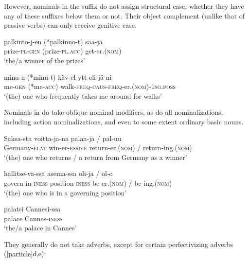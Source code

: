 \documentclass[output=paper,
modfonts
]{LSP/langsci}
\newcommand{\rfa}[2]{(\ref{#1}{#2})}
\begin{document}
 However, nominals in the suffix  do not assign structural
case,  whether they have any of these suffixes below them or not.  Their object
complement (unlike that of passive verbs) can only receive genitive case.
\begin{exe}
\ex
\ea \gll palkinto-j-en (*palkinno-t) saa-ja \\
prize-\textsc{pl}-\textsc{gen} (prize-\textsc{pl}.\textsc{acc}) get-er.(\textsc{nom})\\
\glt `the/a winner of the prizes'

\ex \gll minu-n (*minu-t) käv-el-ytt-eli-jä-ni \\
me-\textsc{gen} (*me-\textsc{acc}) walk-\textsc{freq}-\textsc{caus}-\textsc{freq}-er.(\textsc{nom})-\textsc{1sg}.\textsc{poss}\\
\glt `(the) one who frequently takes me around for walks'  
\z
\end{exe}
Nominals in  do take oblique nominal modifiers, as do all nominalizations, including
action nominalizations, and even to some extent ordinary basic nouns.
\begin{exe}
\ex\label{cann}
	\ea \gll Saksa-sta voitta-ja-na palaa-ja / pal-uu \\
    Germany-\textsc{elat} win-er-\textsc{essive} return-er.(\textsc{nom}) / return-ing.(\textsc{nom})\\
    \glt `(the) one who returns / a return from Germany as a winner' 
 
	\ex \gll hallitse-va-ssa asema-ssa oli-ja / ol-o \\
govern-in-\textsc{iness} position-\textsc{iness} be-er.(\textsc{nom}) / be-ing.(\textsc{nom}) \\
\glt `(the) one who is in a governing position'

  	\ex \gll palatsi Cannesi-ssa\\
    palace     Cannes-\textsc{iness}\\
    \glt `the/a palace in Cannes'
    \z 
\end{exe}
They generally do not take adverbs, except for certain perfectivizing adverbs \rfa{particle}{d,e}:
\end{document}
